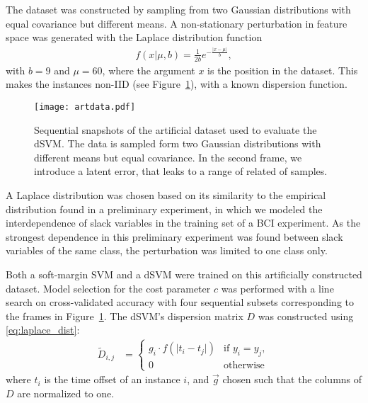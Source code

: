 The dataset was constructed by sampling from two Gaussian distributions with
equal covariance but different means. A non-stationary perturbation
in feature space was generated with the Laplace distribution function
\begin{align} \label{eq:laplace_dist}
  f(x \vert \mu, b) = \frac{1}{2b} e^{-\frac{\lvert x - \mu\rvert}{b}},
\end{align}
with $b=9$ and $\mu=60$, where the argument $x$ is the position in the dataset.
This makes the instances non-\ac{IID} (see Figure~\ref{fig:artdata}), with a known dispersion function.

\begin{figure}
  \center
  \texttt{[image: artdata.pdf]}
  \caption{Sequential snapshots of the artificial dataset used to evaluate the
    \protect\ac{dSVM}. The data is sampled form two Gaussian distributions with
    different means but equal covariance. In the second frame, we introduce a
    latent error, that leaks to a range of related of samples.}
  \label{fig:artdata}
\end{figure}

A Laplace distribution was chosen based on its similarity to the empirical
distribution found in a preliminary experiment, in which we modeled the
interdependence of slack variables in the training set of a \ac{BCI}
experiment. As the strongest dependence in this preliminary experiment was
found between slack variables of the same class, the perturbation was limited
to one class only.

\begin{sloppypar}
Both a soft-margin \ac{SVM} and a \ac{dSVM} were trained on this artificially
constructed dataset. Model selection for the cost parameter $c$ was performed
with a line search on cross-validated accuracy with four sequential subsets
corresponding to the frames in Figure~\ref{fig:artdata}. The \ac{dSVM}'s
dispersion matrix $D$ was constructed using \eqref{eq:laplace_dist}:
%
\begin{align} \label{eq:dfunc}
  \tilde{D}_{i,j} &=
    \begin{cases}
      g_i \cdot f(\lvert t_i - t_j \rvert) 
        & \text{if } y_i = y_j,
    \\
      0 & \text{otherwise}
    \end{cases}
\end{align}
where $t_i$ is the time offset of an instance $i$, and $\vec{g}$ chosen such
that the columns of $D$ are normalized to one.
\end{sloppypar}

